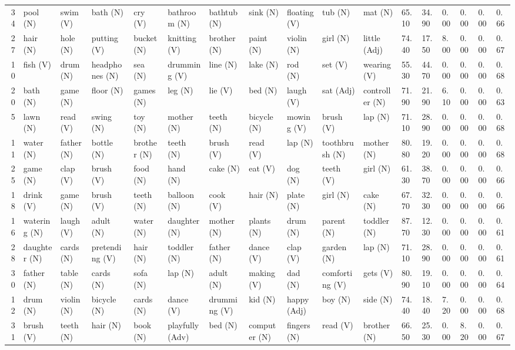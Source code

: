 \begin{tabular}{rllllllllllllllll}
34 & pool (N) & swim (V) & bath (N) & cry (V) & bathroom (N) & bathtub (N) & sink (N) & floating (V) & tub (N) & mat (N) & 65.10 & 34.90 & 0.00 & 0.00 & 0.00 & 0.66 \\
27 & hair (N) & hole (N) & putting (V) & bucket (N) & knitting (V) & brother (N) & paint (N) & violin (N) & girl (N) & little (Adj) & 74.40 & 17.50 & 8.00 & 0.00 & 0.00 & 0.67 \\
10 & fish (V) & drum (N) & headphones (N) & sea (N) & drumming (V) & line (N) & lake (N) & rod (N) & set (V) & wearing (V) & 55.30 & 44.70 & 0.00 & 0.00 & 0.00 & 0.68 \\
20 & bath (N) & game (N) & floor (N) & games (N) & leg (N) & lie (V) & bed (N) & laugh (V) & sat (Adj) & controller (N) & 71.90 & 21.90 & 6.10 & 0.00 & 0.00 & 0.63 \\
5 & lawn (N) & read (V) & swing (N) & toy (N) & mother (N) & teeth (N) & bicycle (N) & mowing (V) & brush (V) & lap (N) & 71.10 & 28.90 & 0.00 & 0.00 & 0.00 & 0.68 \\
11 & water (N) & father (N) & bottle (N) & brother (N) & teeth (N) & brush (V) & read (V) & lap (N) & toothbrush (N) & mother (N) & 80.80 & 19.20 & 0.00 & 0.00 & 0.00 & 0.68 \\
25 & game (N) & clap (V) & brush (V) & food (N) & hand (N) & cake (N) & eat (V) & dog (N) & teeth (V) & girl (N) & 61.30 & 38.70 & 0.00 & 0.00 & 0.00 & 0.66 \\
18 & drink (V) & game (N) & brush (V) & teeth (N) & balloon (N) & cook (V) & hair (N) & plate (N) & girl (N) & cake (N) & 67.70 & 32.30 & 0.00 & 0.00 & 0.00 & 0.66 \\
16 & watering (N) & laugh (V) & adult (N) & water (N) & daughter (N) & mother (N) & plants (N) & drum (N) & parent (N) & toddler (N) & 87.70 & 12.30 & 0.00 & 0.00 & 0.00 & 0.61 \\
28 & daughter (N) & cards (N) & pretending (V) & hair (N) & toddler (N) & father (N) & dance (V) & clap (V) & garden (N) & lap (N) & 71.10 & 28.90 & 0.00 & 0.00 & 0.00 & 0.61 \\
30 & father (N) & table (N) & cards (N) & sofa (N) & lap (N) & adult (N) & making (V) & dad (N) & comforting (V) & gets (V) & 80.90 & 19.10 & 0.00 & 0.00 & 0.00 & 0.64 \\
12 & drum (N) & violin (N) & bicycle (N) & cards (N) & dance (V) & drumming (V) & kid (N) & happy (Adj) & boy (N) & side (N) & 74.40 & 18.40 & 7.20 & 0.00 & 0.00 & 0.68 \\
31 & brush (V) & teeth (N) & hair (N) & book (N) & playfully (Adv) & bed (N) & computer (N) & fingers (N) & read (V) & brother (N) & 66.50 & 25.30 & 0.00 & 8.20 & 0.00 & 0.67 \\

\end{tabular}
